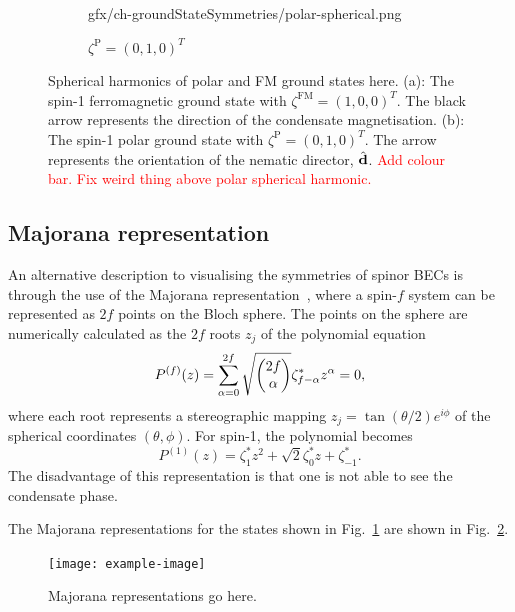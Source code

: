 \begin{figure}
\begin{subfigure}{0.49\textwidth}
        {gfx/ch-groundStateSymmetries/polar-spherical.png}
        \caption{\(\zeta^\mathrm{P}={(0, 1, 0)}^T\)}
    \end{subfigure}
    \caption{Spherical harmonics of polar and FM ground states
    here.
    (a): The spin-1 ferromagnetic ground state with
    \(\zeta^\mathrm{FM}={(1, 0, 0)}^T\).
    The black arrow represents the direction of the condensate magnetisation.
    (b): The spin-1 polar ground state with
    \(\zeta^\mathrm{P}={(0, 1, 0)}^T\).
    The arrow represents the orientation of the nematic director,
    \(\hat{\vb{d}}\).\label{fig: spin-1-spherical-harmonics}
    \textcolor{red}{Add colour bar. Fix weird thing above polar spherical
    harmonic.}}
\end{figure}

\subsection{Majorana representation}
An alternative description to visualising the symmetries of spinor BECs is
through the use of the Majorana representation~\cite{Majorana1932,Bloch1945},
where a spin-\(f\) system can be represented as \(2f\) points on the Bloch
sphere.
The points on the sphere are numerically calculated as the \(2f\) roots
\(z_j\) of the polynomial equation
\begin{equation}
    P^{(f)}(z) = \sum_{\alpha = 0}^{2f}
    \sqrt{\mqty(2f \\ \alpha)}\zeta_{f-\alpha}^*z^\alpha=0,
\end{equation}
where each root represents a stereographic mapping
\(z_j=\tan(\theta/2)e^{i\phi}\) of the spherical coordinates \((\theta, \phi)\).
For spin-1, the polynomial becomes
\begin{equation}
    P^{(1)}(z) = \zeta_1^*z^2+\sqrt{2}\zeta_0^*z+\zeta_{-1}^*.
\end{equation}
The disadvantage of this representation is that one is not able to see the
condensate phase.

The Majorana representations for the states shown in
Fig.~\ref{fig: spin-1-spherical-harmonics} are shown in
Fig.~\ref{fig: spin-1-majorana}.
\begin{figure}
    \centering
    \texttt{[image: example-image]}
    \caption{\label{fig: spin-1-majorana}Majorana representations go here.}
\end{figure}

